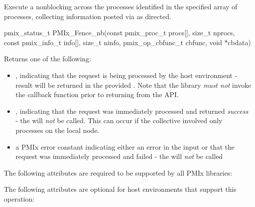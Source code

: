 \summary

Execute a nonblocking  across the processes identified in the specified array of processes, collecting information posted via  as directed.

\format

\cspecificstart
\begin{codepar}
pmix_status_t
PMIx_Fence_nb(const pmix_proc_t procs[], size_t nprocs,
              const pmix_info_t info[], size_t ninfo,
              pmix_op_cbfunc_t cbfunc, void *cbdata)
\end{codepar}
\cspecificend

\begin{arglist}
\end{arglist}

Returns one of the following:

\begin{itemize}
    \item {}, indicating that the request is being processed by the host environment - result will be returned in the provided . Note that the library \emph{must not} invoke the callback function prior to returning from the \ac{API}.
    \item {}, indicating that the request was immediately processed and returned \textit{success} - the  will \textit{not} be called. This can occur if the collective involved only processes on the local node.
    \item a PMIx error constant indicating either an error in the input or that the request was immediately processed and failed - the  will \textit{not} be called
\end{itemize}


\reqattrstart
The following attributes are required to be supported by all \ac{PMIx} libraries:


\reqattrend

\optattrstart
The following attributes are optional for host environments that support this operation:

